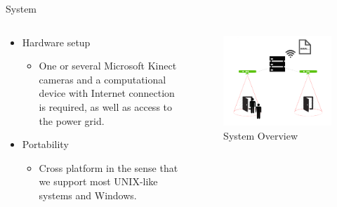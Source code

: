\documentclass[final,hyperref={pdfpagelabels=false}]{beamer}
\begin{document}
\begin{frame}[t]
\begin{columns}[t]
\begin{column}{.465\textwidth}


\begin{block}{System}
	\begin{columns} %
		\begin{column}{.54\textwidth} %
			\begin{itemize}
				\item Hardware setup
				\begin{itemize}
					\item One or several Microsoft Kinect cameras and a computational device with Internet connection is required, as well as access to the power grid.
				\end{itemize}
				\item Portability
				\begin{itemize}
					\item Cross platform in the sense that we support most UNIX-like systems and Windows.
				\end{itemize}							
			\end{itemize}
		\end{column}
			
		\begin{column}{.43\textwidth} %
			\centering
			\begin{figure}
				\includegraphics[width=0.9\linewidth]{system_overview.png}
				\caption{System Overview}
			\end{figure}
		\end{column}
	\end{columns} %


\end{block}
\end{column}
\end{columns}
\end{frame}
\end{document}
